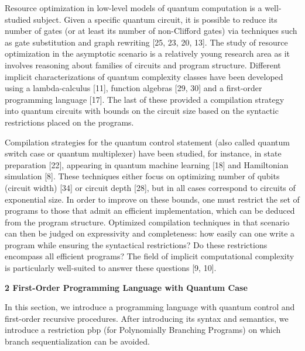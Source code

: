 \documentclass[10pt,a4paper]{amsart}
\begin{document}
Resource optimization in low-level models of quantum computation is a well-studied subject. Given a specific quantum circuit, it is possible to reduce its number of gates (or at least its number of non-Clifford gates) via techniques such as gate substitution and graph rewriting [25, 23, 20, 13]. The study of resource optimization in the asymptotic scenario is a relatively young research area as it involves reasoning about families of circuits and program structure. Different implicit characterizations of quantum complexity classes have been developed using a lambda-calculus [11], function algebras [29, 30] and a first-order programming language [17]. The last of these provided a compilation strategy into quantum circuits with bounds on the circuit size based on the syntactic restrictions placed on the programs.\par
 
 
 
Compilation strategies for the quantum control statement (also called quantum switch case or quantum multiplexer) have been studied, for instance, in state preparation [22], appearing in quantum machine learning [18] and Hamiltonian simulation [8]. These techniques either focus on optimizing number of qubits (circuit width) [34] or circuit depth [28], but in all cases correspond to circuits of exponential size. In order to improve on these bounds, one must restrict the set of programs to those that admit an efficient implementation, which can be deduced from the program structure. Optimized compilation techniques in that scenario can then be judged on expressivity and completeness: how easily can one write a program while ensuring the syntactical restrictions? Do these restrictions encompass all efficient programs? The field of implicit computational complexity is particularly well-suited to answer these questions [9, 10].\par
 
 
 


 
\par\medskip\noindent\textbf{2 First-Order Programming Language with Quantum Case}\par
 
 
In this section, we introduce a programming language with quantum control and first-order recursive procedures. After introducing its syntax and semantics, we introduce a restriction pbp (for Polynomially Branching Programs) on which branch sequentialization can be avoided.\par
 
\end{document}
